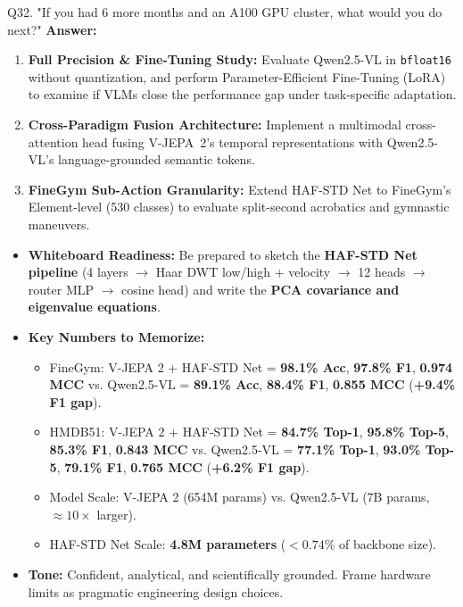 \documentclass[a4paper, 11pt]{article}
\begin{document}
\begin{questionbox}{Q32. "If you had 6 more months and an A100 GPU cluster, what would you do next?"}
\textbf{Answer:}
\begin{enumerate}
    \item \textbf{Full Precision \& Fine-Tuning Study:} Evaluate Qwen2.5-VL in \texttt{bfloat16} without quantization, and perform Parameter-Efficient Fine-Tuning (LoRA) to examine if VLMs close the performance gap under task-specific adaptation.
    \item \textbf{Cross-Paradigm Fusion Architecture:} Implement a multimodal cross-attention head fusing V-JEPA~2's temporal representations with Qwen2.5-VL's language-grounded semantic tokens.
    \item \textbf{FineGym Sub-Action Granularity:} Extend HAF-STD Net to FineGym's Element-level (530 classes) to evaluate split-second acrobatics and gymnastic maneuvers.
\end{enumerate}
\end{questionbox}

\vspace{0.4cm}
\begin{tipbox}
\begin{itemize}
    \item \textbf{Whiteboard Readiness:} Be prepared to sketch the \textbf{HAF-STD Net pipeline} (4 layers $\rightarrow$ Haar DWT low/high + velocity $\rightarrow$ 12 heads $\rightarrow$ router MLP $\rightarrow$ cosine head) and write the \textbf{PCA covariance and eigenvalue equations}.
    \item \textbf{Key Numbers to Memorize:}
    \begin{itemize}
        \item FineGym: V-JEPA 2 + HAF-STD Net = \textbf{98.1\% Acc}, \textbf{97.8\% F1}, \textbf{0.974 MCC} vs. Qwen2.5-VL = \textbf{89.1\% Acc}, \textbf{88.4\% F1}, \textbf{0.855 MCC} (\textbf{+9.4\% F1 gap}).
        \item HMDB51: V-JEPA 2 + HAF-STD Net = \textbf{84.7\% Top-1}, \textbf{95.8\% Top-5}, \textbf{85.3\% F1}, \textbf{0.843 MCC} vs. Qwen2.5-VL = \textbf{77.1\% Top-1}, \textbf{93.0\% Top-5}, \textbf{79.1\% F1}, \textbf{0.765 MCC} (\textbf{+6.2\% F1 gap}).
        \item Model Scale: V-JEPA 2 (654M params) vs. Qwen2.5-VL (7B params, $\approx 10\times$ larger).
        \item HAF-STD Net Scale: \textbf{4.8M parameters} ($<0.74\%$ of backbone size).
    \end{itemize}
    \item \textbf{Tone:} Confident, analytical, and scientifically grounded. Frame hardware limits as pragmatic engineering design choices.
\end{itemize}
\end{tipbox}
\end{document}
